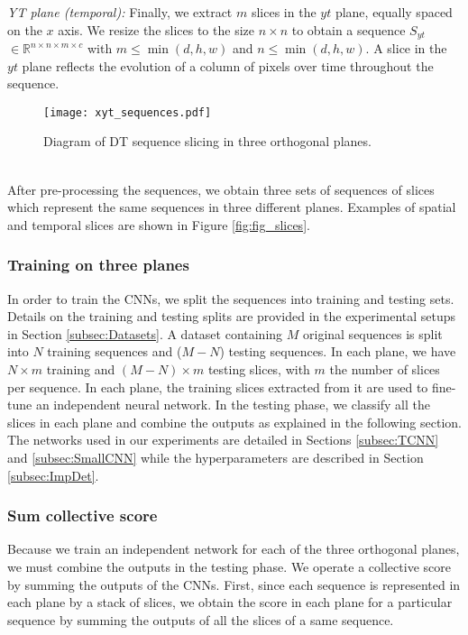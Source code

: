 \documentclass[a4paper,11pt]{article}
\newcommand{\field}[1]{\mathbb{#1}}
\newcommand{\R}{\field{R}}
\begin{document}
\textit{YT plane (temporal):}
Finally, we extract $m$ slices in the $yt$ plane, equally spaced on the $x$ axis. We resize the slices to the size $n\times n$ to obtain a sequence \textbf{$S_{yt}$} $\in \R^{n\times n\times m\times c}$ with $m \leq \min(d,h,w)$ and $n \leq \min(d,h,w)$.
A slice in the $yt$ plane reflects the evolution of a column of pixels over time throughout the sequence.
\begin{figure*}[!t]
\centering
\texttt{[image: xyt\_sequences.pdf]}
  \caption{Diagram of DT sequence slicing in three orthogonal planes.}\label{fig:xyt_sequences}
\end{figure*}
\\After pre-processing the sequences, we obtain three sets of sequences of slices which represent the same sequences in three different planes.
Examples of spatial and temporal slices are shown in Figure \ref{fig:fig_slices}.

\subsubsection{Training on three planes}\leavevmode \par
In order to train the CNNs, we split the sequences into training and testing sets.
Details on the training and testing splits are provided in the experimental setups in Section \ref{subsec:Datasets}.
A dataset containing $M$ original sequences is split into $N$ training sequences and ($M-N$) testing sequences. In each plane, we have $N\times m$ training and $(M-N)\times m$ testing slices, with $m$ the number of slices per sequence.
In each plane, the training slices extracted from it are used to fine-tune an independent neural network. In the testing phase, we classify all the slices in each plane and combine the outputs as explained in the following section.
The networks used in our experiments are detailed in Sections \ref{subsec:TCNN} and \ref{subsec:SmallCNN} while the hyperparameters are described in Section \ref{subsec:ImpDet}.

\subsubsection{Sum collective score}\leavevmode \par
Because we train an independent network for each of the three orthogonal planes, we must combine the outputs in the testing phase.
We operate a collective score by summing the outputs of the CNNs. 
First, since each sequence is represented in each plane by a stack of slices, we obtain the score in each plane for a particular sequence by summing the outputs of all the slices of a same sequence.
\end{document}
